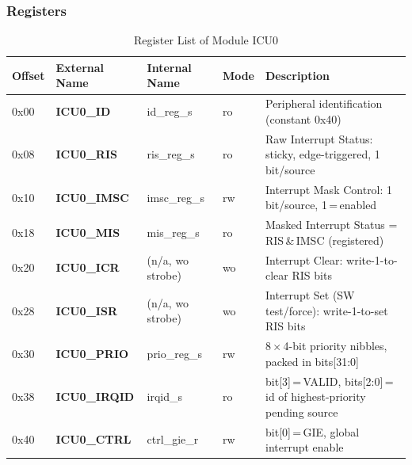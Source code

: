 \subsubsection{Registers}

\begin{table}[H]
\caption{Register List of Module ICU0}
\label{tab:asIcuPer03}
\centering
\begin{tabularx}{\textwidth}{|l |l |l |l |X|}
  \hline
  Offset & External Name & Internal Name & Mode & Description \\
  \hline
  \hline
  0x00 & \textbf{ICU0\_ID}    & id\_reg\_s     & ro & Peripheral identification (constant 0x40) \\
  \hline
  0x08 & \textbf{ICU0\_RIS}   & ris\_reg\_s    & ro & Raw Interrupt Status: sticky, edge-triggered, 1 bit/source \\
  \hline
  0x10 & \textbf{ICU0\_IMSC}  & imsc\_reg\_s   & rw & Interrupt Mask Control: 1 bit/source, 1\,=\,enabled \\
  \hline
  0x18 & \textbf{ICU0\_MIS}   & mis\_reg\_s    & ro & Masked Interrupt Status = RIS\,\&\,IMSC (registered) \\
  \hline
  0x20 & \textbf{ICU0\_ICR}   & (n/a, wo strobe) & wo & Interrupt Clear: write-1-to-clear RIS bits \\
  \hline
  0x28 & \textbf{ICU0\_ISR}   & (n/a, wo strobe) & wo & Interrupt Set (SW test/force): write-1-to-set RIS bits \\
  \hline
  0x30 & \textbf{ICU0\_PRIO}  & prio\_reg\_s   & rw & 8\,$\times$\,4-bit priority nibbles, packed in bits[31:0] \\
  \hline
  0x38 & \textbf{ICU0\_IRQID} & irqid\_s       & ro & bit[3]\,=\,VALID, bits[2:0]\,=\,id of highest-priority pending source \\
  \hline
  0x40 & \textbf{ICU0\_CTRL}  & ctrl\_gie\_r   & rw & bit[0]\,=\,GIE, global interrupt enable \\
  \hline
\end{tabularx}
\end{table}

